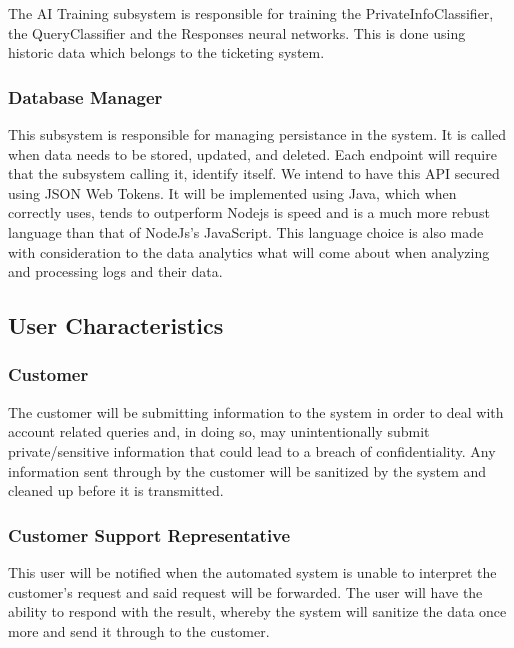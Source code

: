 \documentclass[11pt]{article}
\begin{document}
The AI Training subsystem is responsible for training the PrivateInfoClassifier, the QueryClassifier and the Responses neural networks. This is done using historic data which belongs to the ticketing system.

\subsubsection{Database Manager}

This subsystem is responsible for managing persistance in the system. It is called when data needs to be stored, updated, and deleted. Each endpoint will require that the subsystem calling it, identify itself. We intend to have this API secured using JSON Web Tokens. It will be implemented using Java, which when correctly uses, tends to outperform Nodejs is speed\cite{Website:2}  and is a much more rebust language than that of NodeJs's JavaScript\cite{Website:2}. This language choice is also made with consideration to the data analytics what will come about when analyzing and processing logs and their data.

\subsection{User Characteristics}

\subsubsection{Customer}
The customer will be submitting information to the system in order to deal with account related queries and, in doing so, may unintentionally submit private/sensitive information that could lead to a breach of confidentiality. Any information sent through by the customer will be sanitized by the system and cleaned up before it is transmitted.

\subsubsection{Customer Support Representative}
This user will be notified when the automated system is unable to interpret the customer's request and said request will be forwarded. The user will have the ability to respond with the result, whereby the system will sanitize the data once more and send it through to the customer.
\end{document}
